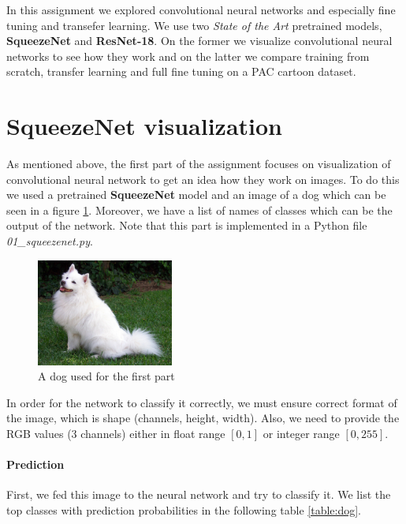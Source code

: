\documentclass[a4paper,11pt]{article}
\begin{document}
In this assignment we explored convolutional neural networks and especially fine tuning and transefer learning.
We use two \textit{State of the Art} pretrained models, \textbf{SqueezeNet} and \textbf{ResNet-18}.
On the former we visualize convolutional neural networks to see how they work and on the latter we compare training from scratch, transfer learning and full fine tuning on a PAC cartoon dataset.

\section{SqueezeNet visualization}
As mentioned above, the first part of the assignment focuses on visualization of convolutional neural network to get an idea how they work on images.
To do this we used a pretrained \textbf{SqueezeNet} model and an image of a dog which can be seen in a figure \ref{fig:dog}.
Moreover, we have a list of names of classes which can be the output of the network.
Note that this part is implemented in a Python file \textit{01\_squeezenet.py}.

\begin{figure}[ht]
    \centering
    \includegraphics[width=0.4\textwidth]{../data/dog.jpg}
    \caption{A dog used for the first part}
    \label{fig:dog}
\end{figure}

In order for the network to classify it correctly, we must ensure correct format of the image, which is shape (channels, height, width).
Also, we need to provide the RGB values (3 channels) either in float range $[0, 1]$ or integer range $[0, 255]$.

\paragraph*{Prediction} First, we fed this image to the neural network and try to classify it.
We list the top classes with prediction probabilities in the following table \ref{table:dog}.
\end{document}
